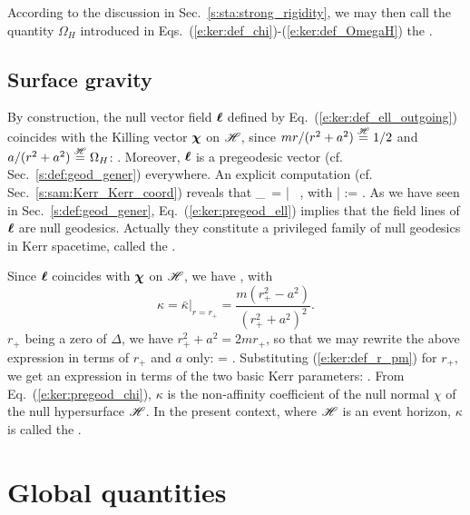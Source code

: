 According to the discussion in Sec.~\ref{s:sta:strong_rigidity}, we may then
call the quantity $\Omega_H$ introduced in
Eqs.~(\ref{e:ker:def_chi})-(\ref{e:ker:def_OmegaH}) the
.


\subsection{Surface gravity} \label{s:ker:surf_grav}

By construction, the null vector field $\bm{\ell}$ defined by Eq.~(\ref{e:ker:def_ell_outgoing}) coincides with the Killing vector $\bm{\chi}$ on $\mathscr{H}$,
since $m r/(r^2 + a^2) \stackrel{\mathscr{H}}{=} 1/2$ and $a/(r^2+a^2) \stackrel{\mathscr{H}}{=} \Omega_H$:
\be
    \wl \equalH \w{\chi} .
\ee
Moreover, $\bm{\ell}$ is a pregeodesic vector (cf. Sec.~\ref{s:def:geod_gener}) everywhere.
An explicit computation (cf. Sec.~\ref{s:sam:Kerr_Kerr_coord}) reveals that
\be \label{e:ker:pregeod_ell}
    \wnab_{\wl}\, \wl = \bar{\kappa} \, \wl ,
\ee
with
\be
    \bar{\kappa} :=  .
\ee
As we have seen in Sec.~\ref{s:def:geod_gener}, Eq.~(\ref{e:ker:pregeod_ell})
 implies that the field
lines of $\bm{\ell}$ are null geodesics. Actually they constitute a privileged
family of null geodesics in Kerr spacetime, called the
.

Since $\bm{\ell}$ coincides with $\bm{\chi}$ on $\mathscr{H}$, we have
\be \label{e:ker:pregeod_chi}
    \encadre{ \wnab_{\w{\chi}}\, \w{\chi} \equalH \kappa \, \w{\chi} },
\ee
with
\[
    \kappa = \left. \bar{\kappa} \right| _{r=r_+} = \frac{m(r_+^2-a^2)}{(r_+^2+a^2)^2} .
\]
$r_+$ being a zero of $\Delta$, we have $r_+^2 + a^2 = 2 m r_+$, so that we may
rewrite the above expression in terms of $r_+$ and $a$ only:
\be
    \kappa =  .
\ee
Substituting (\ref{e:ker:def_r_pm}) for $r_+$, we get an expression in terms
of the two basic Kerr parameters:
\be
     .
\ee
From Eq.~(\ref{e:ker:pregeod_chi}), $\kappa$ is the non-affinity coefficient
of the null normal $\chi$ of the null hypersurface $\mathscr{H}$. In the present
context, where $\mathscr{H}$ is an event horizon, $\kappa$ is called
the .


\section{Global quantities}

